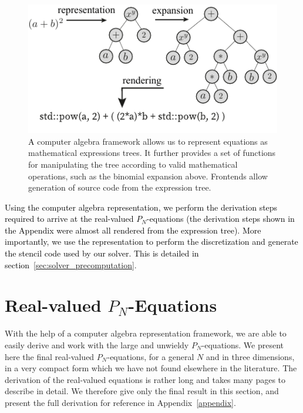 \documentclass{egpubl}
\newcommand{\icaption}[1]{\caption{#1}}
\newcommand{\rev}[1]{\textcolor{black}{#1}}
\newcommand{\nocontentsline}[3]{}
\newcommand{\tocless}[2]{\bgroup\let\addcontentsline=\nocontentsline#1{#2}\egroup}
\begin{document}
\begin{figure}[h]
\centering
\includegraphics[width=0.95\columnwidth]{fig_car_small.pdf}
\icaption{\rev{A} computer algebra framework allows us to represent equations as mathematical expressions trees. It further provides a set of functions for manipulating the tree according to valid mathematical operations, such as the binomial expansion above. Frontends allow generation of source code from the expression tree.\vspace{-0.2in} \label{fig:car}}
\end{figure}

\rev{Using the computer algebra representation, we perform the derivation steps required to arrive at the real-valued $P_N$-equations (the derivation steps shown in the Appendix were almost all rendered from the expression tree). More importantly, we use the representation to perform the discretization and generate the stencil code used by our solver. This is detailed in section~\ref{sec:solver_precomputation}}.


\tocless\section{Real-valued $P_N$-Equations \label{sec:real_valued_pn_eq}}

With the help of \rev{a} computer algebra representation framework, we are able to easily derive and work with the large and unwieldy $P_N$-equations. We present here the final real-valued $P_N$-equations, for a general $N$ and in three dimensions, in a very compact form which we have not found elsewhere in the literature. The derivation of the real-valued equations is rather long and takes many pages to describe in detail. We therefore give only the final result in this section, and present the full derivation for reference in Appendix~\ref{appendix}. 
\end{document}
